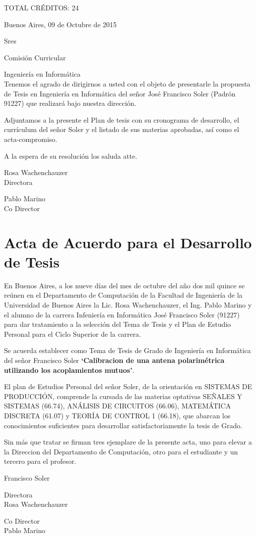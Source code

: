 \documentclass[a4paper,10pt]{article}
\begin{document}
	TOTAL CRÉDITOS: 24

\newpage
\begingroup
\pagestyle{empty}

\hfill Buenos Aires, 09 de Octubre de 2015

\noindent Sres

\noindent Comisión Curricular

\noindent Ingeniería en Informática
\\

Tenemos el agrado de dirigirnos a usted con el objeto de presentarle la 
propuesta de Tesis en Ingeniería en Informática del señor José Francisco Soler 
(Padrón 91227) que realizará bajo nuestra dirección.

Adjuntamos a la presente el Plan de tesis con su cronograma de desarrollo, el 
currículum del señor Soler y el listado de sus materias aprobadas, así como el 
acta-compromiso.

A la espera de su resolución los saluda atte.

\vspace*{3cm}

\hfill \parbox{3.5cm}{Rosa Wachenchauzer\\Directora} \hfill 
\parbox{3cm}{Pablo Marino\\Co Director}

\newpage

\section*{\centering Acta de Acuerdo para el Desarrollo de Tesis}

En Buenos Aires, a los nueve días del mes de octubre del año dos mil quince se 
reúnen en el Departamento de Computación de la Facultad de Ingeniería de la 
Universidad de Buenos Aires la Lic. Rosa Wachenchauzer, el Ing. Pablo Marino y 
el alumno de la carrera Infeniería en Informática José Francisco Soler (91227) 
para dar tratamiento a la selección del Tema de Tesis y el Plan de Estudio 
Personal para el Ciclo Superior de la carrera.

Se acuerda establecer como Tema de Tesis de Grado de Ingeniería en Informática 
del señor Francisco Soler \textbf{\enquote*{Calibracion de una antena 
polarimétrica utilizando los acoplamientos mutuos}}.

El plan de Estudios Personal del señor Soler, de la orientación en SISTEMAS DE 
PRODUCCIÓN, comprende la cursada de las materias optativas SEÑALES Y SISTEMAS 
(66.74), ANÁLISIS DE CIRCUITOS (66.06), MATEMÁTICA DISCRETA (61.07) y TEORÍA DE 
CONTROL 1 (66.18), que abarcan los conocimientos suficientes para desarrollar 
satisfactoriamente la tesis de Grado.

Sin más que tratar se firman tres ejemplare de la presente acta, uno para elevar
a la Direccion del Departamento de Computación, otro para el estudiante y un 
tercero para el profesor.

\vspace*{3cm}

Francisco Soler \hfill \parbox{3.5cm}{Directora\\Rosa Wachenchauzer} \hfill 
\parbox{3cm}{Co Director\\ Pablo Marino}

\clearpage
\endgroup
\end{document}
